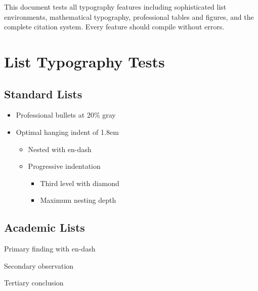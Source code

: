 \documentclass[11pt]{article}
\begin{document}
\thispagestyle{empty}
\titlefootnotesetup
\begin{center}
  \vspace*{\titlespaceminor}
  \articledate{\today}
  \begin{articleabstract}
    This document tests all typography features including sophisticated list environments, mathematical typography, professional tables and figures, and the complete citation system. Every feature should compile without errors.
  \end{articleabstract}
\end{center}
\clearpage
\titlefootnotereset
\setcounter{page}{1}

\section{List Typography Tests}

\subsection{Standard Lists}
\begin{itemize}
\item Professional bullets at 20\% gray
\item Optimal hanging indent of 1.8em
  \begin{itemize}
  \item Nested with en-dash
  \item Progressive indentation
    \begin{itemize}
    \item Third level with diamond
    \item Maximum nesting depth
    \end{itemize}
  \end{itemize}
\end{itemize}

\subsection{Academic Lists}
\begin{academicitem}
\item Primary finding with en-dash
\item Secondary observation
\item Tertiary conclusion
\end{academicitem}
\end{document}
